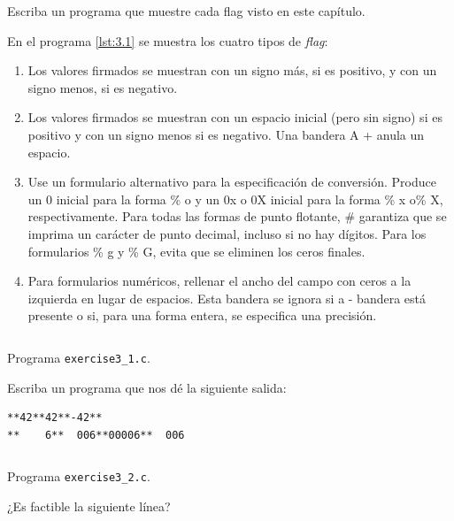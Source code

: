 \documentclass[spanish,addpoints,answers,a4paper]{exam}
\begin{document}
\begin{questions}

\question Escriba un programa que muestre cada flag visto en este capítulo.

\begin{solution}
En el programa \ref{lst:3.1} se muestra los cuatro tipos de \textit{flag}:

\begin{enumerate}
	\item Los valores firmados se muestran con un signo más, si es positivo, y con un signo menos, si es negativo.
	\item Los valores firmados se muestran con un espacio inicial (pero sin signo) si es positivo y con un signo menos si es negativo. Una bandera A + anula un espacio.
	\item Use un formulario alternativo para la especificación de conversión. Produce un 0 inicial para la forma \% o y un 0x o 0X inicial para la forma \% x o\% X, respectivamente. Para todas las formas de punto flotante, \# garantiza que se imprima un carácter de punto decimal, incluso si no hay dígitos. Para los formularios \% g y \% G, evita que se eliminen los ceros finales.
	\item Para formularios numéricos, rellenar el ancho del campo con ceros a la izquierda en lugar de espacios. Esta bandera se ignora si a - bandera está presente o si, para una forma entera, se especifica una precisión.
\end{enumerate}

\begin{listing}[H]
\footnotesize
\inputminted{c}{exercise3_1.c}
\caption{Programa \texttt{exercise3\_1.c}.}
\label{lst:3.1}
\end{listing}
\end{solution}

\question Escriba un programa que nos dé la siguiente salida:

\begin{verbatim}
**42**42**-42**
**    6**  006**00006**  006
\end{verbatim}

\begin{solution}
\begin{listing}[H]
\footnotesize
\inputminted{c}{exercise3_2.c}
\caption{Programa \texttt{exercise3\_2.c}.}
\label{lst:3.2}
\end{listing}
\end{solution}

\question ¿Es factible la siguiente línea?


\end{questions}
\end{document}
